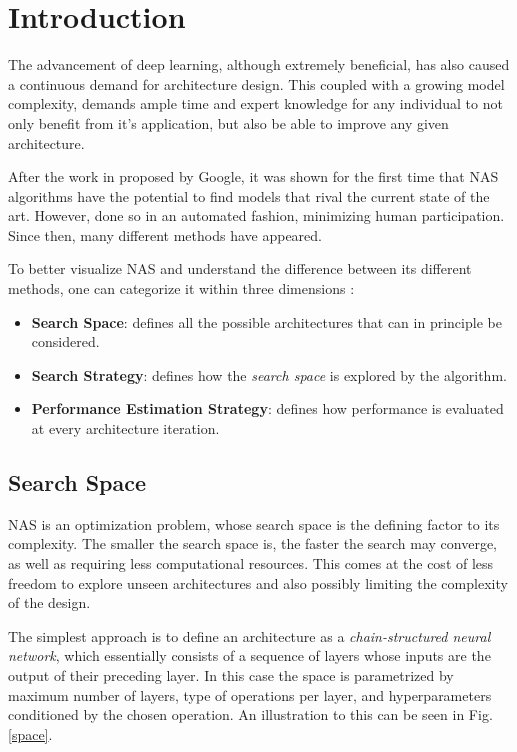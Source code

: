\documentclass[10pt,        %
               a4paper,     %
               journal,     %
               ]{IEEEtran}
\begin{document}
\section{Introduction}
The advancement of deep learning, although extremely beneficial, has also caused a continuous demand for
architecture design. This coupled with a growing model complexity, demands ample time and expert knowledge for
any individual to not only benefit from it's application, but also be able to improve any given architecture.

After the work in \cite{zoph2016neural} proposed by Google, it was shown for the first time that NAS algorithms
have the potential to find models that rival the current state of the art. However, done so in an automated fashion, minimizing
human participation. Since then, many different methods have appeared.

To better visualize NAS and understand the difference between its different methods,
one can categorize it within three dimensions \cite{elsken2019neural}:
\begin{itemize}
    \item \textbf{Search Space}: defines all the possible architectures that can in principle be considered.

    \item \textbf{Search Strategy}: defines how the \textit{search space} is explored by the algorithm.

    \item \textbf{Performance Estimation Strategy}: defines how performance is evaluated at every architecture iteration.
\end{itemize}

\subsection{Search Space}
NAS is an optimization problem, whose search space is the defining factor to its complexity.
The smaller the search space is, the faster the search may converge,
as well as requiring less computational resources. This comes at the cost of less freedom to
explore unseen architectures and also possibly limiting the complexity of the design.

The simplest approach is to define an architecture as a \textit{chain-structured neural network}, which essentially consists of a
sequence of layers whose inputs are the output of their preceding layer. In this case the space is parametrized by maximum number
of layers, type of operations per layer, and hyperparameters conditioned by the chosen operation. An illustration to this can be
seen in Fig. \ref{space}.
\end{document}
